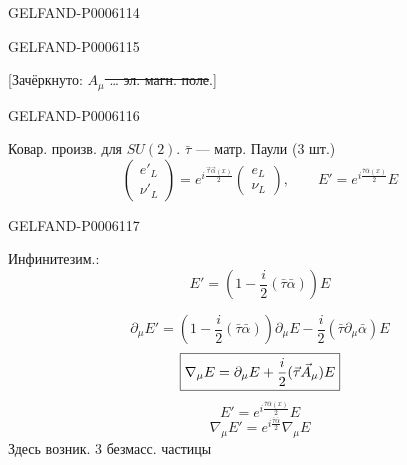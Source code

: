\begin{GelfandAdjacentEvidence}{GELFAND-P000611}{4}



\end{GelfandAdjacentEvidence}
\begin{GelfandAdjacentEvidence}{GELFAND-P000611}{5}


[Зачёркнуто: \sout{\(A_\mu\) … эл. магн. поле}.]
\end{GelfandAdjacentEvidence}
\begin{GelfandAdjacentEvidence}{GELFAND-P000611}{6}


Ковар. произв. для \(SU(2)\).
\qquad \(\bar\tau\) — матр. Паули (3 шт.)
\[
\begin{pmatrix}e'_L\\\nu'_L\end{pmatrix}
=e^{i\frac{\vec\tau\vec\alpha(x)}2}
\begin{pmatrix}e_L\\\nu_L\end{pmatrix},
\qquad E'=e^{i\frac{\bar\tau\bar\alpha(x)}2}E
\]
\end{GelfandAdjacentEvidence}
\begin{GelfandAdjacentEvidence}{GELFAND-P000611}{7}

Инфинитезим.:
\[
E'=\left(1-\frac i2(\bar\tau\bar\alpha)\right)E
\]
\end{GelfandAdjacentEvidence}

\[
\partial_\mu E'=
\left(1-\frac i2(\bar\tau\bar\alpha)\right)\partial_\mu E
-\frac i2(\bar\tau\partial_\mu\bar\alpha)E
\]
\[
\fbox{$\displaystyle\nabla_\mu E
=\partial_\mu E+\frac i2(\vec\tau\vec A_\mu)E$}
\]
\[
E'=e^{i\frac{\bar\tau\bar\alpha(x)}2}E
\]
\[
\nabla_\mu E'=e^{i\frac{\bar\tau\bar\alpha}2}\nabla_\mu E
\]
Здесь возник. 3 безмасс. частицы


